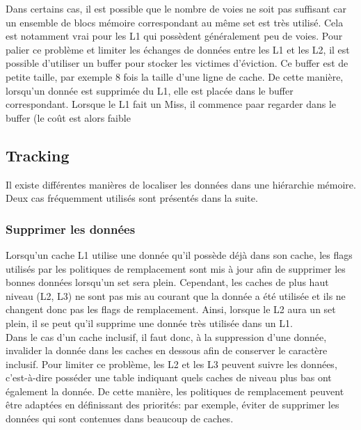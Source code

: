 \documentclass[a4paper]{article}
\begin{document}
\indent Dans certains cas, il est possible que le nombre de voies ne soit pas suffisant car un ensemble de blocs mémoire correspondant au même set est très utilisé. Cela est notamment vrai pour les L1 qui possèdent généralement peu de voies. Pour palier ce problème et limiter les échanges de données entre les L1 et les L2, il est possible d'utiliser un buffer pour stocker les victimes d'éviction. Ce buffer est de petite taille, par exemple $8$ fois la taille d'une ligne de cache. De cette manière, lorsqu'un donnée est supprimée du L1, elle est placée dans le buffer correspondant. Lorsque le L1 fait un Miss, il commence paar regarder dans le buffer (le coût est alors faible

\subsection{Tracking}
\indent Il existe différentes manières de localiser les données dans une hiérarchie mémoire. Deux cas fréquemment utilisés sont présentés dans la suite.

\subsubsection{Supprimer les données}
\indent Lorsqu'un cache L1 utilise une donnée qu'il possède déjà dans son cache, les flags utilisés par les politiques de remplacement sont mis à jour afin de supprimer les bonnes données lorsqu'un set sera plein. Cependant, les caches de plus haut niveau (L2, L3) ne sont pas mis au courant que la donnée a été utilisée et ils ne changent donc pas les flags de remplacement. Ainsi, lorsque le L2 aura un set plein, il se peut qu'il supprime une donnée très utilisée dans un L1. \\

\indent Dans le cas d'un cache inclusif, il faut donc, à la suppression d'une donnée, invalider la donnée dans les caches en dessous afin de conserver le caractère inclusif. Pour limiter ce problème, les L2 et les L3 peuvent suivre les données, c'est-à-dire posséder une table indiquant quels caches de niveau plus bas ont également la donnée. De cette manière, les politiques de remplacement peuvent être adaptées en définissant des priorités: par exemple, éviter de supprimer les données qui sont contenues dans beaucoup de caches.
\end{document}
